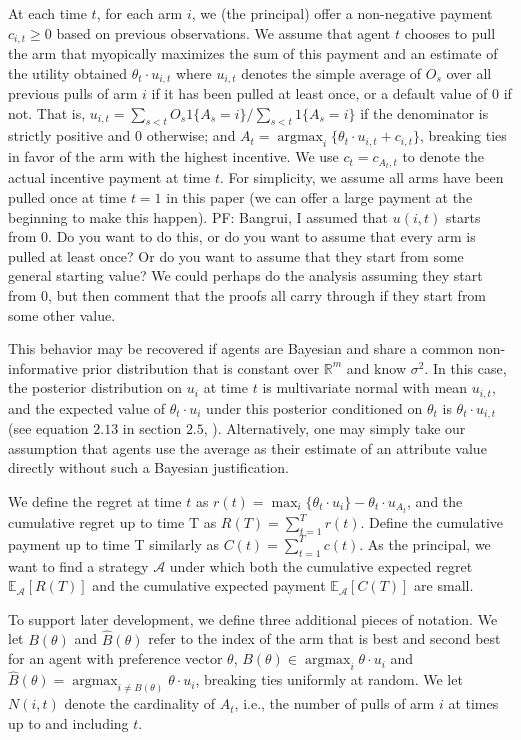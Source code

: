 \documentclass{article}
\newcommand{\argmax}{\mathop{\mathrm{argmax}}}
\newcommand{\pfcomment}[1]{{\color{blue}PF: #1}}
\begin{document}
At each time $t$, for each arm $i$, we (the principal) offer a non-negative payment $c_{i,t}\geq 0$ based on previous observations.
We assume that agent $t$ chooses to pull the arm that myopically maximizes the sum of this payment and an estimate of the utility obtained $\theta_t \cdot u_{i,t}$ where $u_{i,t}$ denotes the simple average of $O_s$ over all previous pulls of arm $i$ if it has been pulled at least once, or a default value of $0$ if not.  That is, $u_{i,t} = \sum_{s<t} O_s 1\{A_s = i\} / \sum_{s<t} 1\{A_s = i\}$ if the denominator is strictly positive and $0$ otherwise; and $A_t=\argmax_{i}\{\theta_t\cdot u_{i,t}+c_{i,t}\}$, breaking ties in favor of the arm with the highest incentive.  We use $c_t=c_{A_{t},t}$ to denote the actual incentive payment at time $t$. For simplicity, we assume all arms have been pulled once at time $t=1$ in this paper (we can offer a large payment at the beginning to make this happen). \pfcomment{Bangrui, I assumed that $u(i,t)$ starts from $0$.  Do you want to do this, or do you want to assume that every arm is pulled at least once?  Or do you want to assume that they start from some general starting value?  We could perhaps do the analysis assuming they start from $0$, but then comment that the proofs all carry through if they start from some other value.}

This behavior may be recovered if agents are Bayesian and share a common non-informative prior distribution that is constant over $\mathbb{R}^m$ and know $\sigma^2$.  In this case, the posterior distribution on $u_{i}$ at time $t$ is multivariate normal with mean $u_{i,t}$, and the expected value of $\theta_t \cdot u_i$ under this posterior conditioned on $\theta_t$ is $\theta_t \cdot u_{i,t}$ (see equation $2.13$ in section $2.5$, \cite{Ge04}).  Alternatively, one may simply take our assumption that agents use the average as their estimate of an attribute value directly without such a Bayesian justification.

We define the regret at time $t$ as $r(t)=\max_{i}\{\theta_{t}\cdot u_{i}\}-\theta_t\cdot u_{A_t}$, and the cumulative regret up to time T as $R(T)=\sum_{t=1}^{T}r(t)$. Define the cumulative payment up to time T similarly as $C(t)=\sum_{t=1}^{T}c(t)$. 
As the principal, we want to find a strategy $\mathcal{A}$ under which both the cumulative expected regret $\mathbb{E}_{\mathcal{A}}[R(T)]$ and the cumulative expected payment $\mathbb{E}_{\mathcal{A}}[C(T)]$ are small.

To support later development, we define three additional pieces of notation.
We let $B(\theta)$ and $\hat{B}(\theta)$ refer to the index of the arm that is best and second best for an agent with preference vector $\theta$, $B(\theta) \in \argmax_i \theta \cdot u_i$ and $\hat{B}(\theta)=\argmax_{i\neq B(\theta)}\theta\cdot u_{i}$, breaking ties uniformly at random. We let $N(i,t)$ denote the cardinality of $A_t$, i.e., the number of pulls of arm $i$ at times up to and including $t$.
\end{document}
